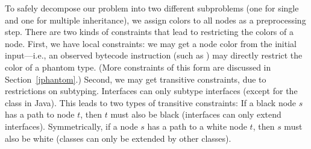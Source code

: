 To safely decompose our problem into two different subproblems (one
for single and one for multiple inheritance), we assign colors to all
nodes as a preprocessing step. There are two kinds of constraints that
lead to restricting the colors of a node. First, we have local
constraints: we may get a node color from the initial input---i.e., an
observed bytecode instruction (such as ) may
directly restrict the color of a phantom type. (More constraints of
this form are discussed in Section~\ref{jphantom}.) Second, we may get
transitive constraints, due to restrictions on subtyping. Interfaces
can only subtype interfaces (except for the  class in
Java). This leads to two types of transitive constraints: If a black
node $s$ has a path to node $t$, then $t$ must also be black
(interfaces can only extend interfaces). Symmetrically, if a node $s$
has a path to a white node $t$, then $s$ must also be white (classes
can only be extended by other classes).





